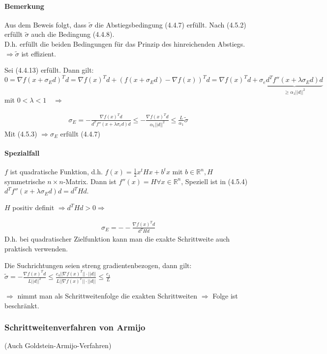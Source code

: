 \documentclass[ngerman,halfparskip]{scrartcl}
\theoremstyle{definition}
\def\R{\mathbb R}
\begin{document}
\paragraph{Bemerkung} Aus dem Beweis folgt, dass $\tilde \sigma$ die Abstiegsbedingung (4.4.7) erfüllt. Nach (4.5.2) erfüllt $\tilde \sigma$ auch die Bedingung (4.4.8).\\
D.h. erfüllt die beiden Bedingungen für das Prinzip des hinreichenden Abstiegs. \\
$\Rightarrow \tilde \sigma$ ist effizient.

Sei (4.4.13) erfüllt. Dann gilt:
$0=\nabla f(x+\sigma_Ed)^Td=\nabla f(x)^Td + (f(x+\sigma_Ed)-\nabla f(x))^Td=\nabla f(x)^Td+\sigma_e\underbrace{d^Tf''(x+\lambda\sigma_Ed)d}_{\geq \alpha_1||d||^2}$ mit $0<\lambda<1\quad \Rightarrow$

\begin{gather*}\tag{4.5.4}
\sigma_E=-\frac {\nabla f(x)^Td}{d^Tf''(x+\lambda\sigma_e d)d}\leq -\frac{\nabla f(x)^Td}{\alpha_1||d||^2}\leq \frac L{\alpha_1}\tilde \sigma
\end{gather*}
Mit (4.5.3) $\Rightarrow \sigma_E$ erfüllt (4.4.7)

\paragraph*{Spezialfall} $f$ ist quadratische Funktion, d.h. $f(x)=\frac 12 x^tHx+b^tx$ mit $ b\in\R^n, H$ symmetrische $n\times n$-Matrix. Dann ist $f''(x)=H \forall x\in\R^n$, Speziell ist in (4.5.4) $d^Tf''(x+\lambda \sigma_Ed)d=d^THd$.

$H$ positiv definit $\Rightarrow d^THd>0 \Rightarrow$

\begin{gather*}\tag{4.5.5}
\sigma_E=--\frac{\nabla f(x)^Td}{d^THd}
\end{gather*}
D.h. bei quadratischer Zielfunktion kann man die exakte Schrittweite auch praktisch verwenden.

Die Suchrichtungen seien streng gradientenbezogen, dann gilt: \\
$\tilde \sigma =-\frac {\nabla f(x)^Td}{L||d||^2}\leq \frac{c_4 ||\nabla f(x)^T||\cdot||d||}{L||\nabla f(x)^T||\cdot||d||}\leq \frac {c_4}L$

$\Rightarrow$ nimmt man als Schrittweitenfolge die exakten Schrittweiten $\Rightarrow$ Folge ist beschränkt.


\subsubsection{Schrittweitenverfahren von Armijo} 
(Auch Goldstein-Armijo-Verfahren)
\end{document}
